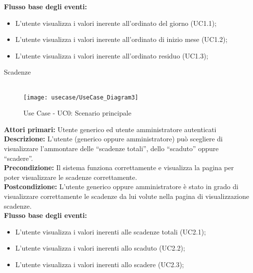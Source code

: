 \textbf{Flusso base degli eventi:} 

\begin{itemize}

\item L’utente visualizza i valori inerente all’ordinato del giorno (UC1.1);
\item L’utente visualizza i valori inerente all’ordinato di inizio mese (UC1.2);
\item L’utente visualizza i valori inerente all’ordinato residuo (UC1.3);

\end{itemize}



Scadenze \\\\

\begin{figure}[!h] 
    \centering 
    \texttt{[image: usecase/UseCase\_Diagram3]} 
    \caption{Use Case - UC0: Scenario principale}
\end{figure} 


\textbf{Attori primari:} Utente generico ed utente amministratore autenticati
\\


\textbf{Descrizione:}  L’utente (generico oppure amministratore) può scegliere di visualizzare l’ammontare delle “scadenze totali”, dello “scaduto” oppure “scadere”.  \\

\textbf{Precondizione:} Il sistema funziona correttamente e visualizza la pagina per poter visualizzare le scadenze correttamente. \\

\textbf{Postcondizione:} L’utente generico oppure amministratore è stato in grado di visualizzare correttamente le scadenze da lui volute nella pagina di visualizzazione scadenze. \\


\textbf{Flusso base degli eventi:} 

\begin{itemize}

\item L’utente visualizza i valori inerenti alle scadenze totali (UC2.1);
\item L’utente visualizza i valori inerenti allo scaduto (UC2.2);
\item L’utente visualizza i valori inerenti allo scadere (UC2.3);


\end{itemize}




